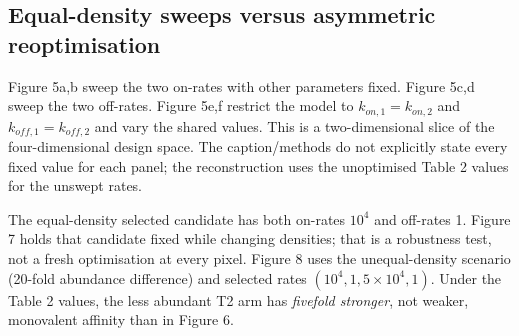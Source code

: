 \documentclass[11pt,a4paper]{article}
\begin{document}
\subsection{Equal-density sweeps versus asymmetric reoptimisation}
Figure 5a,b sweep the two on-rates with other parameters fixed. Figure 5c,d sweep the two off-rates. Figure 5e,f restrict the model to $k_{on,1}=k_{on,2}$ and $k_{off,1}=k_{off,2}$ and vary the shared values. This is a two-dimensional slice of the four-dimensional design space. The caption/methods do not explicitly state every fixed value for each panel; the reconstruction uses the unoptimised Table 2 values for the unswept rates.

The equal-density selected candidate has both on-rates $10^4$ and off-rates 1. Figure 7 holds that candidate fixed while changing densities; that is a robustness test, not a fresh optimisation at every pixel. Figure 8 uses the unequal-density scenario (20-fold abundance difference) and selected rates $(10^4,1,5\times10^4,1)$. Under the Table 2 values, the less abundant T2 arm has \emph{fivefold stronger}, not weaker, monovalent affinity than in Figure 6.
\end{document}

